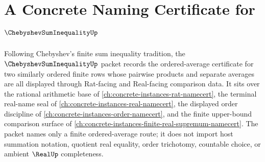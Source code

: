 \chapter{A Concrete Naming Certificate for $\ChebyshevSumInequalityUp$}
\label{ch:concrete-instances-chebyshev-sum-inequality-namecert}

Following Chebyshev's finite sum inequality tradition, the $\ChebyshevSumInequalityUp$ packet records the ordered-average certificate for two similarly ordered finite rows whose pairwise products and separate averages are all displayed through Rat-facing and Real-facing comparison data. It sits over the rational arithmetic base of \autoref{ch:concrete-instances-rat-namecert}, the terminal real-name seal of \autoref{ch:concrete-instances-real-namecert}, the displayed order discipline of \autoref{ch:concrete-instances-order-namecert}, and the finite upper-bound comparison surface of \autoref{ch:concrete-instances-finite-real-supremum-namecert}. The packet names only a finite ordered-average route; it does not import host summation notation, quotient real equality, order trichotomy, countable choice, or ambient $\RealUp$ completeness.

